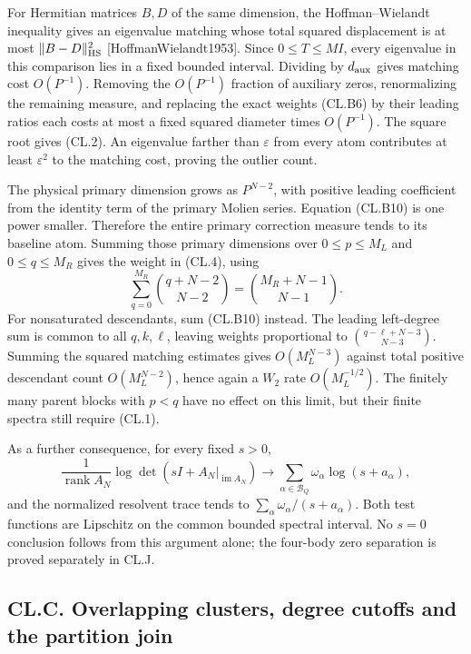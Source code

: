 For Hermitian matrices \(B,D\) of the same dimension, the Hoffman--Wielandt inequality gives an eigenvalue matching whose total squared displacement is at most \(\|B-D\|_{\rm HS}^2\) {[}HoffmanWielandt1953{]}. Since \(0\leq T\leq MI\), every eigenvalue in this comparison lies in a fixed bounded interval. Dividing by \(d_{\rm aux}\) gives matching cost \(O(P^{-1})\). Removing the \(O(P^{-1})\) fraction of auxiliary zeros, renormalizing the remaining measure, and replacing the exact weights (CL.B6) by their leading ratios each costs at most a fixed squared diameter times \(O(P^{-1})\). The square root gives (CL.2). An eigenvalue farther than \(\varepsilon\) from every atom contributes at least \(\varepsilon^2\) to the matching cost, proving the outlier count.

The physical primary dimension grows as \(P^{N-2}\), with positive leading coefficient from the identity term of the primary Molien series. Equation (CL.B10) is one power smaller. Therefore the entire primary correction measure tends to its baseline atom. Summing those primary dimensions over \(0\leq p\leq M_L\) and \(0\leq q\leq M_R\) gives the weight in (CL.4), using \[
\sum_{q=0}^{M_R}\binom{q+N-2}{N-2}
=\binom{M_R+N-1}{N-1}.
\] For nonsaturated descendants, sum (CL.B10) instead. The leading left-degree sum is common to all \(q,k,\ell\), leaving weights proportional to \(\binom{q-\ell+N-3}{N-3}\). Summing the squared matching estimates gives \(O(M_L^{N-3})\) against total positive descendant count \(O(M_L^{N-2})\), hence again a \(W_2\) rate \(O(M_L^{-1/2})\). The finitely many parent blocks with \(p<q\) have no effect on this limit, but their finite spectra still require (CL.1).

As a further consequence, for every fixed \(s>0\), \[
\frac1{\operatorname{rank}A_N}
\log\det(sI+A_N|_{\operatorname{im}A_N})
\longrightarrow\sum_{\alpha\in\mathcal B_Q}\omega_\alpha\log(s+a_\alpha),
\] and the normalized resolvent trace tends to \(\sum_\alpha\omega_\alpha/(s+a_\alpha)\). Both test functions are Lipschitz on the common bounded spectral interval. No \(s=0\) conclusion follows from this argument alone; the four-body zero separation is proved separately in CL.J.

\hypertarget{cl.c.-overlapping-clusters-degree-cutoffs-and-the-partition-join}{%
\subsection{CL.C. Overlapping clusters, degree cutoffs and the partition join}\label{cl.c.-overlapping-clusters-degree-cutoffs-and-the-partition-join}}

